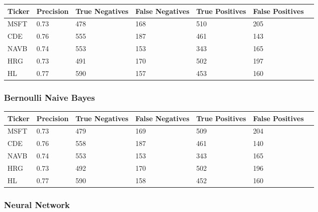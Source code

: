 \begin{center}
    \begin{tabular}{ | l | l | l | | l | l | l | p{5cm} |}
    \hline
    Ticker & Precision & True Negatives & False Negatives & True Positives & False Positives \\ \hline
    MSFT & 0.73 & 478 & 168 & 510 & 205 \\ \hline
    CDE & 0.76 & 555 & 187 & 461 & 143 \\ \hline
    NAVB & 0.74 & 553 & 153 & 343 & 165 \\ \hline
    HRG & 0.73 & 491 & 170 & 502 & 197 \\ \hline
    HL & 0.77 & 590 & 157 & 453 & 160 \\
    \hline
    \end{tabular}
    \label{table:nonfloat}
\end{center}

\subsubsection{Bernoulli Naive Bayes}

\begin{center}
    \begin{tabular}{ | l | l | l | | l | l | l | p{5cm} |}
    \hline
    Ticker & Precision & True Negatives & False Negatives & True Positives & False Positives \\ \hline
    MSFT & 0.73 & 479 & 169 & 509 & 204 \\ \hline
    CDE & 0.76 & 558 & 187 & 461 & 140 \\ \hline
    NAVB & 0.74 & 553 & 153 & 343 & 165 \\ \hline
    HRG & 0.73 & 492 & 170 & 502 & 196 \\ \hline
    HL & 0.77 & 590 & 158 & 452 & 160 \\
    \hline
    \end{tabular}
    \label{table:nonfloat}
\end{center}

\subsubsection{Neural Network}

